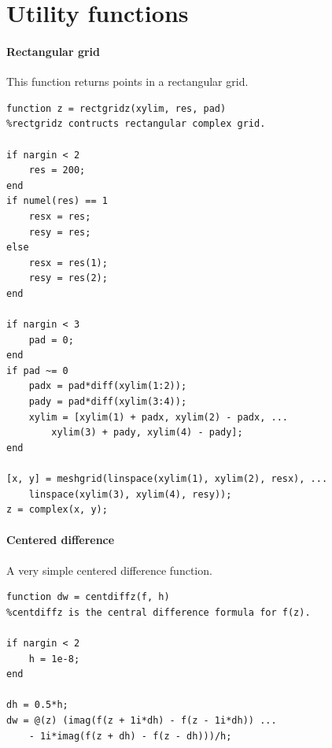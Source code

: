 \documentclass[12pt,fleqn]{article}
\begin{document}



\clearpage
\appendix

\section{Utility functions}
\paragraph{Rectangular grid}
This function returns points in a rectangular grid.
\begin{lstlisting}
function z = rectgridz(xylim, res, pad)
%rectgridz contructs rectangular complex grid.

if nargin < 2
    res = 200;
end
if numel(res) == 1
    resx = res;
    resy = res;
else
    resx = res(1);
    resy = res(2);
end

if nargin < 3
    pad = 0;
end
if pad ~= 0
    padx = pad*diff(xylim(1:2));
    pady = pad*diff(xylim(3:4));
    xylim = [xylim(1) + padx, xylim(2) - padx, ...
        xylim(3) + pady, xylim(4) - pady];
end

[x, y] = meshgrid(linspace(xylim(1), xylim(2), resx), ...
    linspace(xylim(3), xylim(4), resy));
z = complex(x, y);
\end{lstlisting}

\paragraph{Centered difference}
A very simple centered difference function.
\begin{lstlisting}
function dw = centdiffz(f, h)
%centdiffz is the central difference formula for f(z).

if nargin < 2
    h = 1e-8;
end

dh = 0.5*h;
dw = @(z) (imag(f(z + 1i*dh) - f(z - 1i*dh)) ...
    - 1i*imag(f(z + dh) - f(z - dh)))/h;
\end{lstlisting}
\end{document}
